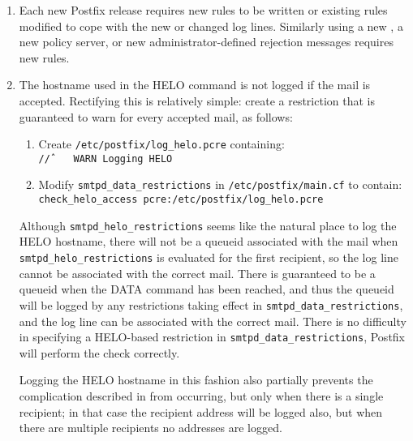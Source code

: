 \label{logging helo}

\begin{enumerate}

    \item Each new Postfix release requires new rules to be written or
        existing rules modified to cope with the new or changed log lines.
        Similarly using a new , a new policy server, or new
        administrator-defined rejection messages requires new rules.

    \item The hostname used in the HELO command is not logged if the mail
        is accepted.  Rectifying this is relatively simple: create a
        restriction that is guaranteed to warn for every accepted mail, as
        follows:

        \begin{enumerate}

            \item Create \texttt{/etc/postfix/log\_helo.pcre}
                containing:\newline{}
                \tab{}\texttt{/\^/~~~~WARN~Logging~HELO}

            \item Modify \texttt{smtpd\_data\_restrictions} in
                \texttt{/etc/postfix/main.cf} to contain:\newline{}
                \tab{}\texttt{check\_helo\_access~pcre:/etc/postfix/log\_helo.pcre}

        \end{enumerate}

        Although \texttt{smtpd\_helo\_restrictions} seems like the natural
        place to log the HELO hostname, there will not be a queueid
        associated with the mail when \texttt{smtpd\_helo\_restrictions} is
        evaluated for the first recipient, so the log line cannot be
        associated with the correct mail.  There is guaranteed to be a
        queueid when the DATA command has been reached, and thus the
        queueid will be logged by any restrictions taking effect in
        \texttt{smtpd\_data\_restrictions}, and the log line can be
        associated with the correct mail.  There is no difficulty in
        specifying a HELO-based restriction in
        \texttt{smtpd\_data\_restrictions}, Postfix will perform the check
        correctly.

        Logging the HELO hostname in this fashion also partially prevents
        the complication described in  from occurring, but only when there is a
        single recipient; in that case the recipient address will be logged
        also, but when there are multiple recipients no addresses are
        logged.


\end{enumerate}
